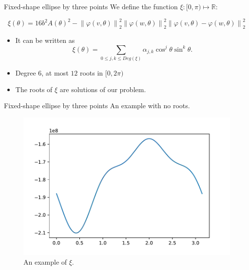 \documentclass{beamer}
\newcommand{\R}{\mathbb{R}}
\newcommand{\norm}[2][2]{\left\lVert#2\right\rVert_{#1}}
\begin{document}
\begin{frame}{Fixed-shape ellipse by three points}
We define the function $\xi : [0, \pi) \mapsto \R$:

	\begin{equation*}
	\xi(\theta) = 16b^2A(\theta)^2 - \norm{\varphi(v, \theta)}^2\norm{\varphi(w, \theta)}^2\norm{\varphi(v, \theta)-\varphi(w, \theta)}^2
	\end{equation*}
	
	\begin{itemize}
		\item It can be written as 
		$$\xi(\theta)=\sum_{0 \le j, k \le Deg(\xi)} \alpha_{j,k}\cos^{j}{\theta}\sin^{k}{\theta}.$$
		\item Degree $6$, at most $12$ roots in $[0, 2\pi)$ \cite[p.~150]{powell}
		\item The roots of $\xi$ are solutions of our problem.	
\end{itemize}
	

	
\end{frame}

\begin{frame}{Fixed-shape ellipse by three points}
	An example with no roots.
	\begin{figure}
		\centering
		
		\includegraphics[scale=.5]{036}
		\caption{An example of $\xi$.}
	\end{figure}
\end{frame}
\end{document}
